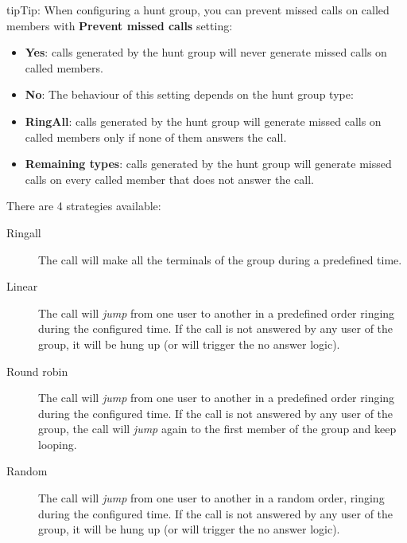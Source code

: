 \documentclass[letterpaper,10pt,english]{sphinxmanual}
\begin{document}
\begin{notice}{tip}{Tip:}
When configuring a hunt group, you can prevent missed calls on called members with \textbf{Prevent missed calls} setting:
\begin{itemize}
\item {} 
\textbf{Yes}: calls generated by the hunt group will never generate missed calls on called members.

\item {} 
\textbf{No}: The behaviour of this setting depends on the hunt group type:

\item {} 
\textbf{RingAll}: calls generated by the hunt group will generate missed calls on called members only if none of them answers the call.

\item {} 
\textbf{Remaining types}: calls generated by the hunt group will generate missed calls on every called member that does not answer the call.

\end{itemize}
\end{notice}

There are 4 strategies available:
\begin{description}
\item[{Ringall}] \leavevmode{}\label{administration_portal/client/vpbx/routing_endpoints/hunt_groups:term-ringall}
The call will make all the terminals of the group during a predefined
time.

\item[{Linear}] \leavevmode{}\label{administration_portal/client/vpbx/routing_endpoints/hunt_groups:term-linear}
The call will \emph{jump} from one user to another in a predefined order
ringing during the configured time. If the call is not answered by any
user of the group, it will be hung up (or will trigger the no answer logic).

\item[{Round robin}] \leavevmode{}\label{administration_portal/client/vpbx/routing_endpoints/hunt_groups:term-round-robin}
The call will \emph{jump} from one user to another in a predefined order
ringing during the configured time. If the call is not answered by any
user of the group, the call will \emph{jump} again to the first member of the
group and keep looping.

\item[{Random}] \leavevmode{}\label{administration_portal/client/vpbx/routing_endpoints/hunt_groups:term-random}
The call will \emph{jump} from one user to another in a random order,
ringing during the configured time.  If the call is not answered by any
user of the group, it will be hung up (or will trigger the no answer logic).

\end{description}
\end{document}
